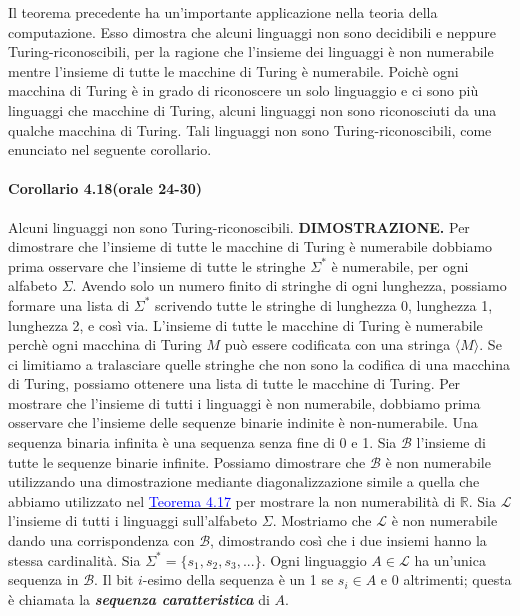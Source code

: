 \documentclass{article}
\begin{document}
Il teorema precedente ha un'importante applicazione nella teoria della computazione.
Esso dimostra che alcuni linguaggi non sono decidibili e neppure Turing-riconoscibili, per la ragione che l'insieme dei linguaggi è non numerabile mentre l'insieme di tutte le macchine di Turing è numerabile.
Poichè ogni macchina di Turing è in grado di riconoscere un solo linguaggio e ci sono più linguaggi che macchine di Turing, alcuni linguaggi non sono riconosciuti da una qualche macchina di Turing.
Tali linguaggi non sono Turing-riconoscibili, come enunciato nel seguente corollario.
\newpage
\paragraph{Corollario 4.18(orale 24-30)}
\label{corollario-4.18}
\text{}
Alcuni linguaggi non sono Turing-riconoscibili.
\vspace{1em}
\text{}
\newline
\hbox{\textbf{DIMOSTRAZIONE.}} 
Per dimostrare che l'insieme di tutte le macchine di Turing è numerabile dobbiamo prima osservare che l'insieme di tutte le stringhe $\Sigma^*$ è numerabile, per ogni alfabeto $\Sigma$.
Avendo solo un numero finito di stringhe di ogni lunghezza, possiamo formare una lista di $\Sigma^*$ scrivendo tutte le stringhe di lunghezza 0, lunghezza 1, lunghezza 2, e così via.
L'insieme di tutte le macchine di Turing è numerabile perchè ogni macchina di Turing $M$ può essere codificata con una stringa $\langle M \rangle$.
Se ci limitiamo a tralasciare quelle stringhe che non sono la codifica di una macchina di Turing, possiamo ottenere una lista di tutte le macchine di Turing.
Per mostrare che l'insieme di tutti i linguaggi è non numerabile, dobbiamo prima osservare che l'insieme delle sequenze binarie indinite è non-numerabile.
Una sequenza binaria infinita è una sequenza senza fine di 0 e 1.
Sia $\mathcal{B}$ l'insieme di tutte le sequenze binarie infinite.
Possiamo dimostrare che $\mathcal{B}$ è non numerabile utilizzando una dimostrazione mediante diagonalizzazione simile a quella che abbiamo utilizzato nel \hyperref[teorema-4.17]{\textcolor{blue}{Teorema 4.17}} per mostrare la non numerabilità di $\mathbb{R}$.
Sia $\mathcal{L}$ l'insieme di tutti i linguaggi sull'alfabeto $\Sigma$.
Mostriamo che $\mathcal{L}$ è non numerabile dando una corrispondenza con $\mathcal{B}$, dimostrando così che i due insiemi hanno la stessa cardinalità.
Sia $\Sigma^* = \{s_1, s_2, s_3, ...\}$.
Ogni linguaggio $A \in \mathcal{L}$ ha un'unica sequenza in $\mathcal{B}$.
Il bit $i$-esimo della sequenza è un 1 se $s_i \in A$ e 0 altrimenti; questa è chiamata la \textbf{\textit{sequenza caratteristica}} di $A$.
\end{document}

